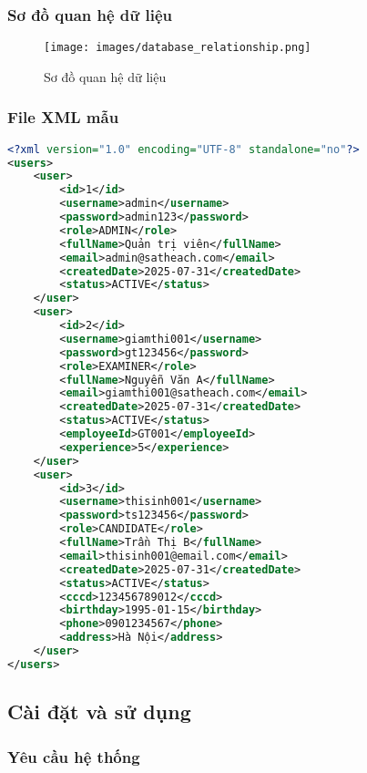 \documentclass[12pt,a4paper]{article}
\begin{document}
\subsubsection{Sơ đồ quan hệ dữ liệu}

\begin{figure}[H]
\centering
\texttt{[image: images/database\_relationship.png]}
\caption{Sơ đồ quan hệ dữ liệu}
\label{fig:database_relationship}
\end{figure}

\subsubsection{File XML mẫu}

\begin{lstlisting}[language=XML, caption=File users.xml mẫu]
<?xml version="1.0" encoding="UTF-8" standalone="no"?>
<users>
    <user>
        <id>1</id>
        <username>admin</username>
        <password>admin123</password>
        <role>ADMIN</role>
        <fullName>Quản trị viên</fullName>
        <email>admin@satheach.com</email>
        <createdDate>2025-07-31</createdDate>
        <status>ACTIVE</status>
    </user>
    <user>
        <id>2</id>
        <username>giamthi001</username>
        <password>gt123456</password>
        <role>EXAMINER</role>
        <fullName>Nguyễn Văn A</fullName>
        <email>giamthi001@satheach.com</email>
        <createdDate>2025-07-31</createdDate>
        <status>ACTIVE</status>
        <employeeId>GT001</employeeId>
        <experience>5</experience>
    </user>
    <user>
        <id>3</id>
        <username>thisinh001</username>
        <password>ts123456</password>
        <role>CANDIDATE</role>
        <fullName>Trần Thị B</fullName>
        <email>thisinh001@email.com</email>
        <createdDate>2025-07-31</createdDate>
        <status>ACTIVE</status>
        <cccd>123456789012</cccd>
        <birthday>1995-01-15</birthday>
        <phone>0901234567</phone>
        <address>Hà Nội</address>
    </user>
</users>
\end{lstlisting}

\subsection{Cài đặt và sử dụng}

\subsubsection{Yêu cầu hệ thống}
\end{document}

